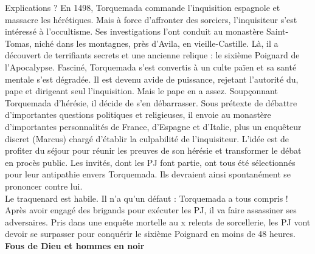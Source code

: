 \documentclass[11pt,twoside,a4paper]{book}
\begin{document}
Explications ? En 1498, Torquemada commande l'inquisition espagnole et massacre les h{\'e}r{\'e}tiques. Mais {\`a} force d'affronter des sorciers, l'inquisiteur s'est int{\'e}ress{\'e} {\`a} l'occultisme. Ses investigations l'ont conduit au monast{\`e}re Saint-Tomas, nich{\'e} dans les montagnes, pr{\`e}s d'Avila, en vieille-Castille. L{\`a}, il a d{\'e}couvert de terrifiants secrets et une ancienne relique : le sixi{\`e}me Poignard de l'Apocalypse. Fascin{\'e}, Torquemada s'est convertis {\`a} un culte pa{\"i}en et sa sant{\'e} mentale s'est d{\'e}grad{\'e}e. Il est devenu avide de puissance, rejetant l'autorit{\'e} du, pape et dirigeant seul l'inquisition. Mais le pape en a assez. Soup\c{c}onnant Torquemada d'h{\'e}r{\'e}sie, il d{\'e}cide de s'en d{\'e}barrasser. Sous pr{\'e}texte de d{\'e}battre d'importantes questions politiques et religieuses, il envoie au monast{\`e}re d'importantes personnalit{\'e}s de France, d'Espagne et d'Italie, plus un enqu{\^e}teur discret (Marcus) charg{\'e} d'{\'e}tablir la culpabilit{\'e} de l'inquisiteur. L'id{\'e}e est de profiter du s{\'e}jour pour r{\'e}unir les preuves de son h{\'e}r{\'e}sie et transformer le d{\'e}bat en proc{\`e}s public. Les invit{\'e}s, dont les PJ font partie, ont tous {\'e}t{\'e} s{\'e}lectionn{\'e}s pour leur antipathie envers Torquemada. Ils devraient ainsi spontan{\'e}ment se prononcer contre lui.~\\

Le traquenard est habile. Il n'a qu'un d{\'e}faut : Torquemada a tous compris ! Apr{\`e}s avoir engag{\'e} des brigands pour ex{\'e}cuter les PJ, il va faire assassiner ses adversaires. Pris dans une enqu{\^e}te mortelle au x relents de sorcellerie, les PJ vont devoir se surpasser pour conqu{\'e}rir le sixi{\`e}me Poignard en moins de 48 heures.~\\

\textbf{\large Fous de Dieu et hommes en noir}~\\
\end{document}
